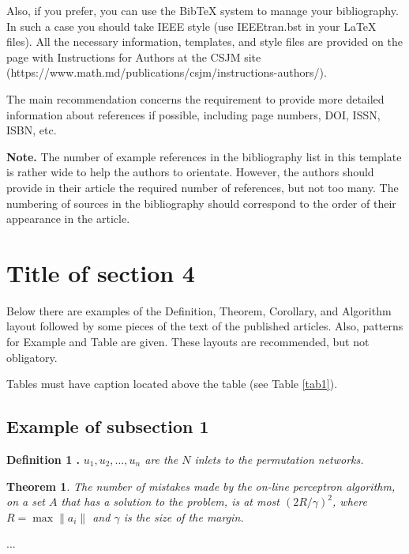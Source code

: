 \documentclass[11pt,a5paper,twoside]{article}
\newtheorem{theorem}{Theorem}
\begin{document}
Also, if you prefer, you can use the BibTeX system to manage your bibliography. In such a case you should take IEEE style (use IEEEtran.bst in your LaTeX files). All the necessary information, templates, and style files are provided on the page with Instructions for Authors at the CSJM site (https://www.math.md/publications/csjm/instructions-authors/).

The main recommendation concerns the requirement to provide more detailed information about references if possible, including page numbers, DOI, ISSN, ISBN, etc.

\textbf{Note.} The number of example references in the bibliography list in this template is rather wide to help the authors to orientate. However, the authors should provide in their article the required number of references, but not too many. The numbering of sources in the bibliography should correspond to the order of their appearance in the article. 

\section{Title of section 4}\label{sect4}
Below there are examples of the Definition, Theorem, Corollary, and Algorithm layout followed by some pieces of the text of the published articles. Also, patterns for Example and Table are given. These layouts are recommended, but not obligatory.

Tables must have caption located above the table (see Table \ref{tab1}).

\subsection{Example of subsection 1}\label{subsect1}
\textbf{Definition 1 \cite{1}.} \textit{$u_1, u_2, \ldots, u_n$ are the $N$ inlets to the permutation networks.} 

\begin{theorem}\cite{3}
	The number of mistakes made by the on-line perceptron algorithm, on a set $A$ that has a solution to the problem, is at most $(2R/\gamma)^2$, where $R=\max\|a_i\|$ and $\gamma$ is the size of the margin.
\end{theorem}

...
\end{document}
